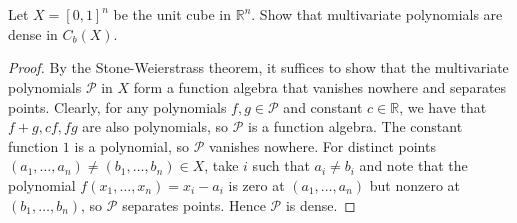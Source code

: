 \documentclass{article}
\newcommand{\R}{\mathbb{R}}
\theoremstyle{definition} %
\numberwithin{thm}{section} %
\theoremstyle{definition} %
\begin{document}
\section{}

Let $X = [0, 1]^n$ be the unit cube in $\R^n$. 
Show that multivariate polynomials are dense in $C_b(X)$.
\begin{proof}
By the Stone-Weierstrass theorem, it suffices to show that 
the multivariate polynomials $\mathcal{P}$ in $X$ form a function
algebra that vanishes nowhere and separates points. Clearly, for any
polynomials $f, g \in \mathcal{P}$ and constant $c \in \R$, we have that
$f + g, cf, fg$ are also polynomials, so $\mathcal{P}$ is a 
function algebra. The constant function $1$ is a polynomial, so
$\mathcal{P}$ vanishes nowhere. For distinct points 
$(a_1, \dots, a_n) \neq (b_1, \dots, b_n) \in X$, take $i$ such that
$a_i \neq b_i$ and note that the polynomial $f(x_1, \dots, x_n) = 
x_i - a_i$ is zero at $(a_1, \dots, a_n)$ but nonzero at
$(b_1, \dots, b_n)$, so $\mathcal{P}$ separates points.
Hence $\mathcal{P}$ is dense.
\end{proof}

\section{}
\end{document}
